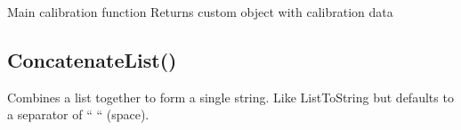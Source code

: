 \documentclass[letterpaper,10pt,english]{sphinxmanual}
\begin{document}
\sphinxAtStartPar
Main calibration function
Returns custom object with calibration data

\sphinxAtStartPar
{}

\begin{sphinxVerbatim}[commandchars=\\\{\}]
\end{sphinxVerbatim}

\ignorespaces 

\subsection{ConcatenateList()}
\label{\detokenize{reference/utility:concatenatelist}}\label{\detokenize{reference/utility:index-1}}
\sphinxAtStartPar
{}

\sphinxAtStartPar
{}

\sphinxAtStartPar
Combines a list together to form a single string. Like ListToString but defaults to a separator of “ “ (space).

\sphinxAtStartPar
{}

\begin{sphinxVerbatim}[commandchars=\\\{\}]
\end{sphinxVerbatim}

\sphinxAtStartPar
{}

\begin{sphinxVerbatim}[commandchars=\\\{\}]
\PYG{p}{[}\PYG{p}{]}
\PYG{p}{[}\PYG{p}{]}
\end{sphinxVerbatim}
\end{document}
